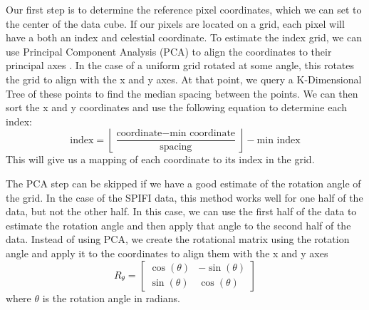 Our first step is to determine the reference pixel coordinates, which we can set to the center of the data cube.
If our pixels are located on a grid, each pixel will have a both an index and celestial coordinate.
To estimate the index grid, we can use Principal Component Analysis (PCA) to align the coordinates to their principal axes \parencite{wold1987principal}.
In the case of a uniform grid rotated at some angle, this rotates the grid to align with the x and y axes.
At that point, we query a K-Dimensional Tree of these points to find the median spacing between the points.
We can then sort the x and y coordinates and use the following equation to determine each index:
\begin{equation}
    \text{index} = \left\lfloor \frac{\text{coordinate} - \text{min coordinate}}{\text{spacing}} \right\rfloor - \text{min index}
    \label{carina/eq:index}
\end{equation}
This will give us a mapping of each coordinate to its index in the grid.

The PCA step can be skipped if we have a good estimate of the rotation angle of the grid.
In the case of the SPIFI data, this method works well for one half of the data, but not the other half.
In this case, we can use the first half of the data to estimate the rotation angle and then apply that angle to the second half of the data.
Instead of using PCA, we create the rotational matrix using the rotation angle and apply it to the coordinates to align them with the x and y axes 
\begin{equation}
    R_\theta = \begin{bmatrix}
        \cos(\theta) & -\sin(\theta) \\
        \sin(\theta) & \cos(\theta)
    \end{bmatrix}
\end{equation}
where $\theta$ is the rotation angle in radians.

